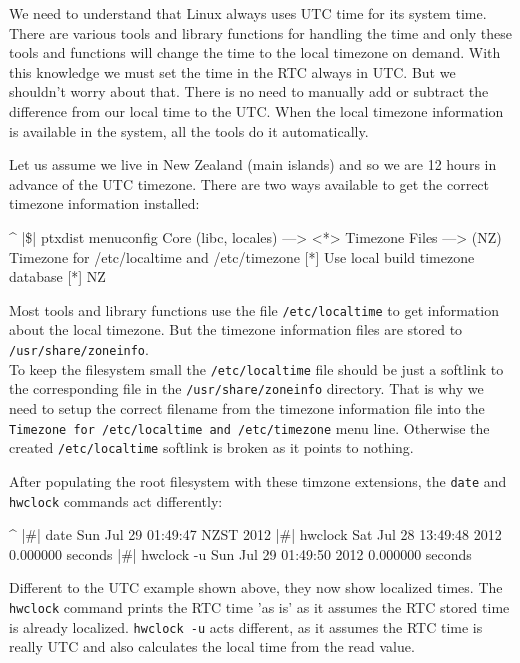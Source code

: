 We need to understand that Linux always uses UTC time for its system time.
There are various tools and library functions for handling
the time and only these tools and functions will change the time to the local
timezone on demand.
With this knowledge we must set the time in the RTC always in UTC. But we
shouldn't worry about that. There is no need to manually add or subtract the
difference from our local time to the UTC. When the local timezone information
is available in the system, all the tools do it automatically.

Let us assume we live in New Zealand (main islands) and so we are 12 hours in
advance of the UTC timezone. There are two ways available to get the correct
timezone information installed:

\begin{ptxshell}[escapechar=|]{^}
|\$| ptxdist menuconfig
  Core (libc, locales) --->
    <*> Timezone Files --->
      (NZ) Timezone for /etc/localtime and /etc/timezone
      [*]   Use local build timezone database
      [*]   NZ
\end{ptxshell}

Most tools and library functions use the file \texttt{/etc/localtime} to
get information about the local timezone. But the timezone information files
are stored to \texttt{/usr/share/zoneinfo}.\\
To keep the filesystem small the \texttt{/etc/localtime} file should be just a
softlink to the corresponding file in the \texttt{/usr/share/zoneinfo}
directory. That is why we need to setup the correct filename from the timezone
information file into the \texttt{Timezone for /etc/localtime and /etc/timezone}
menu line. Otherwise the created \texttt{/etc/localtime} softlink is broken as
it points to nothing.

After populating the root filesystem with these timzone extensions, the
\texttt{date} and \texttt{hwclock} commands act differently:

\begin{ptxshell}[escapechar=|]{^}
|\#| date
Sun Jul 29 01:49:47 NZST 2012
|\#| hwclock
Sat Jul 28 13:49:48 2012  0.000000 seconds
|\#| hwclock -u
Sun Jul 29 01:49:50 2012  0.000000 seconds
\end{ptxshell}

Different to the UTC example shown above, they now show localized times. The
\texttt{hwclock} command prints the RTC time 'as is' as it assumes the RTC
stored time is already localized. \texttt{hwclock -u} acts different, as it
assumes the RTC time is really UTC and also calculates the local time from the
read value.

